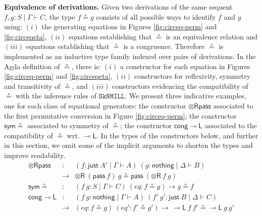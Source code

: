 \documentclass[sn-mathphys-num]{sn-jnl}%
\newcommand{\GG}{\Gamma}
\newcommand{\GD}{\Delta}
\newcommand{\vd}{\vdash}
\newcommand{\tr}{\otimes\mathsf{R}}
\newcommand{\pass}{\mathsf{pass}}
\newcommand{\lolli}{\multimap}
\newcommand{\lleft}{{\lolli}\mathsf{L}}
\newcommand{\SkNMILL}{$\mathtt{SkNMILL}$}
\newcommand{\nothing}{\mathsf{nothing}}
\newcommand{\just}{\mathsf{just}}
\theoremstyle{thmstyleone}%
\theoremstyle{thmstyletwo}%
\theoremstyle{thmstylethree}%
\begin{document}
\noindent\textbf{Equivalence of derivations.}
Given two derivations of the same sequent $f,g : S \mid \Gamma \vdash C$, the type $f \circeq g$ consists of all possible ways to identify $f$ and $g$ using: $(i)$ the generating equations in Figures \ref{fig:circeq-perm} and \ref{fig:circeqeta}, $(ii)$ equations establishing that $\circeq$ is an equivalence relation and $(iii)$ equations establishing that $\circeq$ is a congruence. 
Therefore $\circeq$ is implemented as an inductive type family indexed over pairs of derivations.
In the Agda definition of $\circeq$, there is: $(i)$ a constructor for each equation in Figures \ref{fig:circeq-perm} and \ref{fig:circeqeta}, $(ii)$  constructors for reflexivity, symmetry and transitivity of $\circeq$, and  $(iii)$ constructors evidencing the compatibility of $\circeq$ with the inference rules of \SkNMILL.
We present three indicative examples, one for each class of equational generators: the constructor $\tr\pass$ associated to the first permutative conversion in Figure  \ref{fig:circeq-perm}; the constructor $\mathsf{sym}{\circeq}$ associated to symmetry of $\circeq$; the constructor $\mathsf{cong}\lleft$ associated to the compatibility of $\circeq$ wrt. $\lleft$. In the types of the constructors below, and further in this section, we omit some of the implicit arguments to shorten the types and improve readability.
\[
\begin{array}{rcl}
\tr\pass &:&  (f : \just ~A' \mid \GG \vd A) ~(g : \nothing \mid \GD \vd B) \\
&\to& \tr ~(\pass ~f) ~g \circeq \pass~(\tr~f~g)  \\[2pt]
\mathsf{sym}{\circeq} &:& (f ~g : S \mid \GG \vd C) ~(eq : f \circeq g) \to g \circeq f \\[2pt]
\mathsf{cong}\lleft &:& (f ~g : \nothing \mid \GG \vd A) ~(f' ~g' : \just ~B \mid \GD \vd C) \\
& \to & (eq : f \circeq g) ~(eq' : f' \circeq g') \to \, \lleft ~f ~f' \circeq \lleft ~g ~g'
\end{array}
\]
\end{document}
